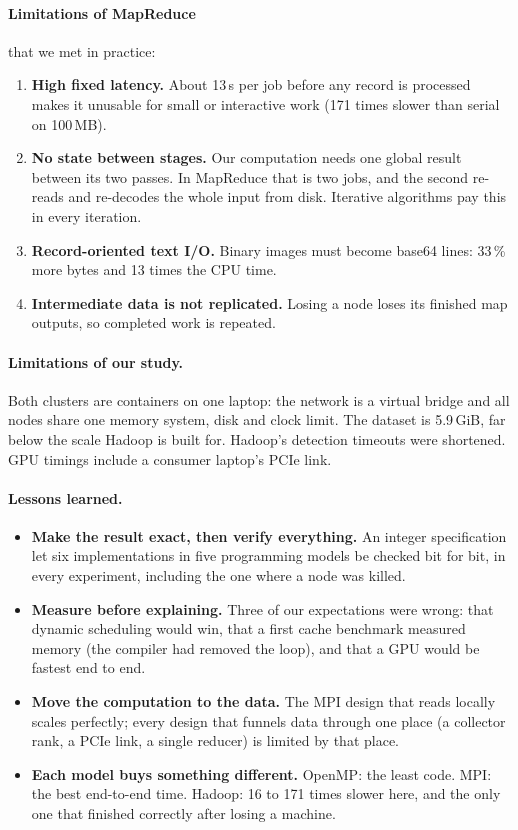 \documentclass{zc-ust-hw}
\begin{document}
\paragraph{Limitations of MapReduce} that we met in practice:
\begin{enumerate}
  \item \textbf{High fixed latency.} About 13\,s per job before any record is processed makes
    it unusable for small or interactive work (171 times slower than serial on 100\,MB).
  \item \textbf{No state between stages.} Our computation needs one global result between its
    two passes. In MapReduce that is two jobs, and the second re-reads and re-decodes the whole
    input from disk. Iterative algorithms pay this in every iteration.
  \item \textbf{Record-oriented text I/O.} Binary images must become base64 lines: 33\,\% more
    bytes and 13 times the CPU time.
  \item \textbf{Intermediate data is not replicated.} Losing a node loses its finished map
    outputs, so completed work is repeated.
\end{enumerate}

\paragraph{Limitations of our study.} Both clusters are containers on one laptop: the network
is a virtual bridge and all nodes share one memory system, disk and clock limit. The dataset is
5.9\,GiB, far below the scale Hadoop is built for. Hadoop's detection timeouts were shortened.
GPU timings include a consumer laptop's PCIe link.

\paragraph{Lessons learned.}
\begin{itemize}
  \item \textbf{Make the result exact, then verify everything.} An integer specification let six
    implementations in five programming models be checked bit for bit, in every experiment,
    including the one where a node was killed.
  \item \textbf{Measure before explaining.} Three of our expectations were wrong: that dynamic
    scheduling would win, that a first cache benchmark measured memory (the compiler had removed
    the loop), and that a GPU would be fastest end to end.
  \item \textbf{Move the computation to the data.} The MPI design that reads locally scales
    perfectly; every design that funnels data through one place (a collector rank, a PCIe link,
    a single reducer) is limited by that place.
  \item \textbf{Each model buys something different.} OpenMP: the least code. MPI: the best
    end-to-end time. Hadoop: 16 to 171 times slower here, and the only one that finished
    correctly after losing a machine.
\end{itemize}
\end{document}
